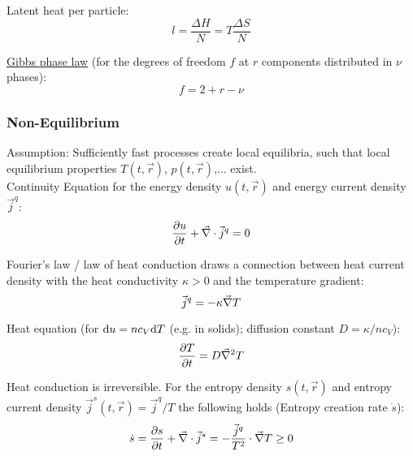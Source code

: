 			\noindent
			Latent heat per particle:
			\begin{equation}
				l = \frac{\Delta H}{N} = T\frac{\Delta S}{N}
			\end{equation}

			\noindent
			\href{https://en.wikipedia.org/wiki/Phase_rule}{Gibbs phase law} (for the degrees of freedom $f$ at $r$ components distributed in $\nu$ phases):
			\begin{equation}
				f = 2 + r - \nu
			\end{equation}

		\subsubsection{Non-Equilibrium}
			\noindent
			Assumption: Sufficiently fast processes create local equilibria, such that local equilibrium properties $T(t,\vec{r})$, $p(t,\vec{r})$,... exist. \\
			Continuity Equation for the energy density $u(t,\vec{r})$ and energy current density $\vec{j}^q$:
			\begin{equation}
				\frac{\partial u}{\partial t} + \vec{\nabla}\cdot\vec{j}^q = 0
			\end{equation}

			\noindent
			Fourier's law / law of heat conduction draws a connection between heat current density with the heat conductivity $\kappa >0$ and the temperature gradient:
			\begin{equation}
				\vec{j}^q = -\kappa \vec{\nabla} T
			\end{equation}

			\noindent
			Heat equation (for $\mathrm{d} u = nc_V \mathrm{d} T$ (e.g. in solids); diffusion constant $D=\kappa/nc_V$):
			\begin{equation}
				\frac{\partial T}{\partial t} = D\vec{\nabla}^2 T
			\end{equation}

			\noindent
			Heat conduction is irreversible. For the entropy density $s(t,\vec{r})$ and entropy current density $\vec{j}^s (t,\vec{r}) = \vec{j}^q/T$ the following holds (Entropy creation rate $\dot{s}$):
			\begin{equation}
				\dot{s} = \frac{\partial s}{\partial t} + \vec{\nabla}\cdot\vec{j}^s = - \frac{\vec{j}^q}{T^2}\cdot\vec{\nabla} T \ge 0
			\end{equation}

